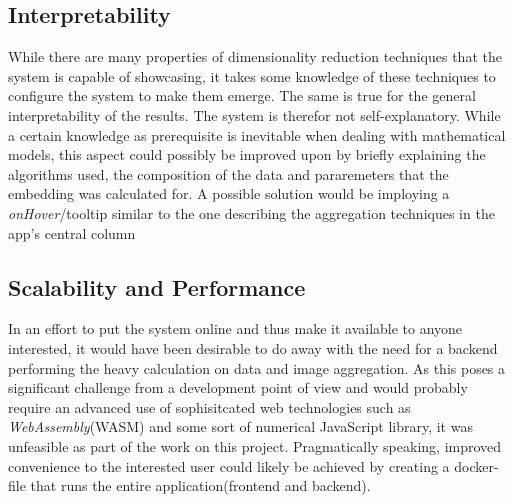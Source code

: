 \documentclass[11pt,a4paper]{article}
\begin{document}
    \subsection*{Interpretability}
        While there are many properties of dimensionality reduction techniques that the system is capable of showcasing, it takes some knowledge of these techniques to configure the system to make them emerge. The same is true for the general interpretability of the results. 
        The system is therefor not self-explanatory. 
        While a certain knowledge as prerequisite is inevitable when dealing with mathematical models, this aspect could possibly be improved upon by briefly explaining the algorithms used, the composition of the data  and pararemeters that the embedding was calculated for. A possible solution would be imploying a \textit{onHover}/tooltip similar to the one describing the aggregation techniques in the app's central column

    \subsection*{Scalability and Performance}
        In an effort to put the system online and thus make it available to anyone interested, it would have been desirable to do away with the need for a backend performing the heavy calculation on data and image aggregation. As this poses a significant challenge from a development point of view and would probably require an advanced use of sophisitcated web technologies such as \textit{WebAssembly}(WASM) and some sort of numerical JavaScript library, it was unfeasible as part of the work on this project. Pragmatically speaking, improved convenience to the interested user could likely be achieved by creating a docker-file that runs the entire application(frontend and backend). 
\end{document}
